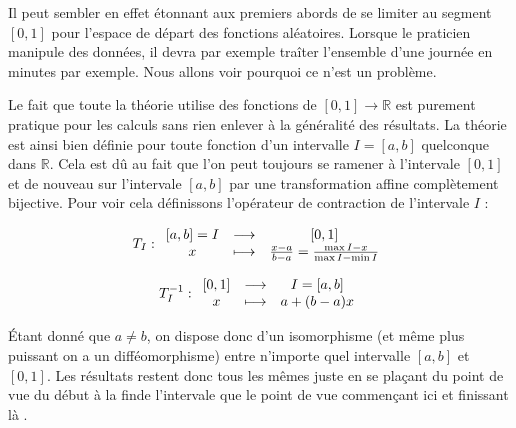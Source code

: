 
Il peut sembler en effet étonnant aux premiers abords de se limiter au segment $[0,1]$ pour l'espace de départ des fonctions aléatoires. Lorsque le praticien manipule des données, il devra par exemple traîter l'ensemble d'une journée en minutes par exemple. Nous allons voir pourquoi ce n'est un problème.

Le fait que toute la théorie utilise des fonctions de $[0,1] \rightarrow \mathds R$ est purement pratique pour les calculs sans rien enlever à la généralité des résultats. La théorie est ainsi bien définie pour toute fonction d'un intervalle $I = [a,b]$ quelconque dans $\mathds R$. Cela est dû au fait que l'on peut toujours se ramener à l'intervale $[0,1]$ et de nouveau sur l'intervale $[a,b]$ par une transformation affine complètement bijective. Pour voir cela définissons l'opérateur de contraction de l'intervale $I$ :

\begin{equation}
	T_I :
	\begin{array}{ccc} [a,b]=I &\longrightarrow& [0,1] \\ x &\longmapsto& \frac{x - a}{b-a} = \frac{\max I - x}{\max I - \min I} \end{array}
\end{equation}

\begin{equation}
	T^{-1}_I : \begin{array}{ccc} [0,1] &\longrightarrow& I = [a,b] \\ x &\longmapsto& a + (b-a)x \end{array}
\end{equation}

Étant donné que $a \neq b$, on dispose donc d'un isomorphisme (et même plus puissant on a un difféomorphisme) entre n'importe quel intervalle $[a,b]$ et $[0,1]$. Les résultats restent donc tous les mêmes juste en se plaçant du point de vue \og du début à la fin\fg de l'intervale que le point de vue \og commençant ici et finissant là \fg.
